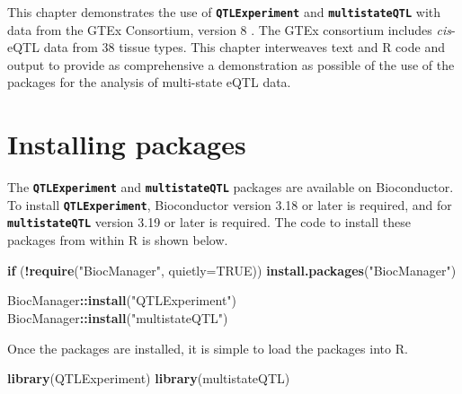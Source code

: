 \documentclass[
]{article}
\author{}
\date{\vspace{-2.5em}}
\newenvironment{Shaded}{\begin{snugshade}}{\end{snugshade}}
\newcommand{\AttributeTok}[1]{\textcolor[rgb]{0.13,0.29,0.53}{#1}}
\newcommand{\ConstantTok}[1]{\textcolor[rgb]{0.56,0.35,0.01}{#1}}
\newcommand{\ControlFlowTok}[1]{\textcolor[rgb]{0.13,0.29,0.53}{\textbf{#1}}}
\newcommand{\FunctionTok}[1]{\textcolor[rgb]{0.13,0.29,0.53}{\textbf{#1}}}
\newcommand{\NormalTok}[1]{#1}
\newcommand{\SpecialCharTok}[1]{\textcolor[rgb]{0.81,0.36,0.00}{\textbf{#1}}}
\newcommand{\StringTok}[1]{\textcolor[rgb]{0.31,0.60,0.02}{#1}}
\begin{document}
\newcommand\textpkg[1]{\textbf{\texttt{#1}}}

This chapter demonstrates the use of \textbf{\texttt{QTLExperiment}} and
\textbf{\texttt{multistateQTL}} with data from the GTEx Consortium,
version 8 \autocite{GTEx_2020}. The GTEx consortium includes
\emph{cis}-eQTL data from 38 tissue types. This chapter interweaves text
and R code and output to provide as comprehensive a demonstration as
possible of the use of the packages for the analysis of multi-state eQTL
data.

\section{Installing packages}\label{installing-packages}

The \textbf{\texttt{QTLExperiment}} and \textbf{\texttt{multistateQTL}}
packages are available on Bioconductor. To install
\textbf{\texttt{QTLExperiment}}, Bioconductor version 3.18 or later is
required, and for \textbf{\texttt{multistateQTL}} version 3.19 or later
is required. The code to install these packages from within R is shown
below.

\footnotesize

\begin{Shaded}
\begin{Highlighting}[]
\ControlFlowTok{if}\NormalTok{ (}\SpecialCharTok{!}\FunctionTok{require}\NormalTok{(}\StringTok{"BiocManager"}\NormalTok{, }\AttributeTok{quietly=}\ConstantTok{TRUE}\NormalTok{))}
    \FunctionTok{install.packages}\NormalTok{(}\StringTok{"BiocManager"}\NormalTok{)}

\NormalTok{BiocManager}\SpecialCharTok{::}\FunctionTok{install}\NormalTok{(}\StringTok{"QTLExperiment"}\NormalTok{)}
\NormalTok{BiocManager}\SpecialCharTok{::}\FunctionTok{install}\NormalTok{(}\StringTok{"multistateQTL"}\NormalTok{)}
\end{Highlighting}
\end{Shaded}

\normalsize

Once the packages are installed, it is simple to load the packages into
R. \footnotesize

\begin{Shaded}
\begin{Highlighting}[]
\FunctionTok{library}\NormalTok{(QTLExperiment)}
\FunctionTok{library}\NormalTok{(multistateQTL)}
\end{Highlighting}
\end{Shaded}
\end{document}
